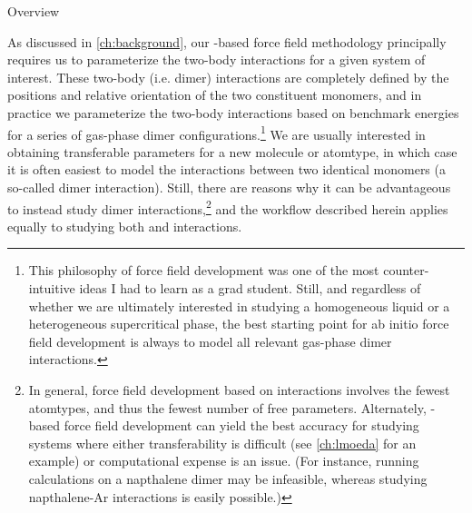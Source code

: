 \begin{section}{Overview}

As discussed in \cref{ch:background}, our \sapt-based force field 
methodology principally requires us to parameterize the two-body interactions
for a given system of interest. These two-body (i.e. dimer)
interactions are completely defined by the 
positions and relative orientation of the two constituent monomers, and in
practice we parameterize the two-body interactions based on benchmark \sapt
energies for a series of gas-phase dimer 
%
configurations.\footnote{This philosophy of force field development was one of the most counter-intuitive ideas I
had to learn as a grad student. Still, and regardless of whether we are ultimately
interested in studying a homogeneous liquid or a heterogeneous supercritical
phase, the best starting point for ab initio force field development is always
to model all relevant gas-phase dimer interactions.}
%
We are usually interested in obtaining
transferable parameters for a new molecule or atomtype, in which case it is
often easiest to model the interactions between two identical monomers (a
so-called \homo dimer interaction). Still, there are reasons why it can
be advantageous to instead study \hetero dimer 
%
interactions,\footnote{In general, force field development based on \homo
interactions involves the fewest atomtypes, and thus the fewest number of free
parameters. Alternately, \hetero-based force field development can yield the
best accuracy for studying systems where either transferability is difficult
(see \cref{ch:lmoeda} for an example) or computational expense is an issue.
(For instance, running \sapt calculations on a napthalene dimer may be
infeasible, whereas studying napthalene-Ar interactions is easily possible.)}
%
and the workflow
described herein applies equally to studying both \homo and \hetero
%
interactions.


\end{section}
